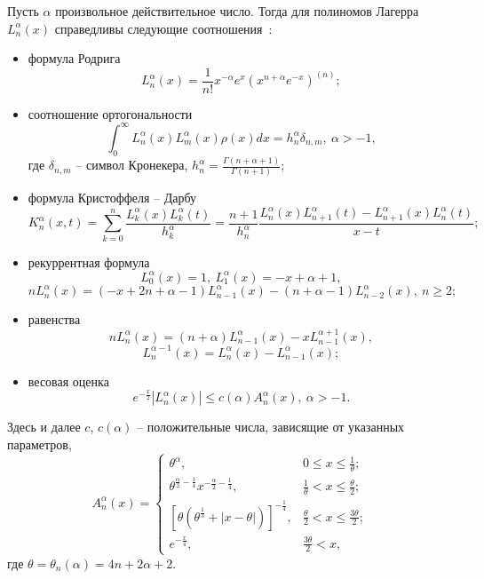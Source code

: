 Пусть $\alpha$ произвольное действительное число. Тогда для полиномов Лагерра $L_n^\alpha(x)$ справедливы следующие соотношения~\cite{Gadzhimirzaev:Szego}:
\begin{itemize}
\item
формула Родрига
$$
L_n^\alpha(x)=\frac{1}{n!}x^{-\alpha}e^x\left(x^{n+\alpha}e^{-x}\right)^{(n)};
$$

\item
соотношение ортогональности
$$
\int_{0}^{\infty}L_n^\alpha(x)L_m^\alpha(x)\rho(x)dx=h_n^\alpha\delta_{n,m},\ \alpha>-1,
$$
где $\delta_{n,m}$ -- символ Кронекера, $h_n^\alpha=\frac{\Gamma(n+\alpha+1)}{\Gamma(n+1)}$;
\item
формула Кристоффеля -- Дарбу
\begin{equation*}\label{Gadzhimirzaev:Darbu}	
K_n^\alpha(x,t)=\sum_{k=0}^{n}\frac{L_k^\alpha(x)L_k^\alpha(t)}{h_k^\alpha}=
\frac{n+1}{h_n^\alpha}\frac{L_n^\alpha(x)L_{n+1}^\alpha(t)-L_{n+1}^\alpha(x)L_n^\alpha(t)}{x-t};
\end{equation*}

\item
рекуррентная формула
$$
L_0^\alpha(x)=1, \ L_1^\alpha(x)=-x+\alpha+1,
$$
\begin{equation*}\label{Gadzhimirzaev:recur}
nL_n^\alpha(x)=(-x+2n+\alpha-1)L_{n-1}^\alpha(x)-(n+\alpha-1)L_{n-2}^{\alpha}(x), \ n\ge2;
\end{equation*}

\item
равенства
\begin{equation*}\label{Gadzhimirzaev:prop1}
nL_n^\alpha(x)=(n+\alpha)L_{n-1}^\alpha(x)-xL_{n-1}^{\alpha+1}(x),
\end{equation*}
\begin{equation*}\label{Gadzhimirzaev:prop2}
L_n^{\alpha-1}(x)=L_{n}^\alpha(x)-L_{n-1}^{\alpha}(x);
\end{equation*}

\item
весовая оценка~\cite{Gadzhimirzaev:AskeyWain, Gadzhimirzaev:Mocken}
\begin{equation*}\label{Gadzhimirzaev:weight-est}
e^{-\frac{x}{2}}|L_n^\alpha(x)|\le c(\alpha)A_n^\alpha(x),\ \alpha>-1.
\end{equation*}
\end{itemize}
Здесь и далее $c$, $c(\alpha)$ -- положительные числа, зависящие от указанных параметров,
$$
A_n^\alpha(x)=
\begin{cases}
	\theta^\alpha, & 0\le x\le \frac{1}{\theta}; \\
	\theta^{\frac{\alpha}{2}-\frac14}x^{-\frac{\alpha}{2}-\frac14}, & \frac{1}{\theta}< x\le \frac{\theta}{2}; \\
	\left[\theta\left(\theta^{\frac13}+|x-\theta|\right)\right]^{-\frac14}, & \frac{\theta}{2}< x\le \frac{3\theta}{2}; \\
	e^{-\frac x4}, & \frac{3\theta}{2}<x,
\end{cases}
$$
где $\theta=\theta_n(\alpha)=4n+2\alpha+2$.


